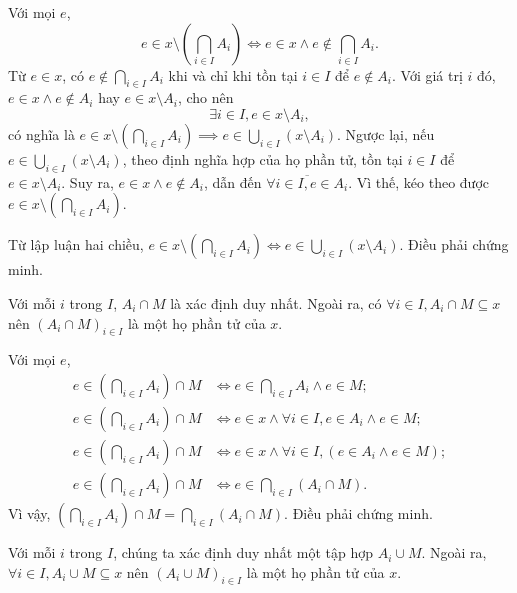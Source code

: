 \stepSubexercise Với mọi $e$, \begin{equation*}
   e \in x \setminus \left(\bigcap_{i \in I}A_i\right) \iff e \in x \land e \notin \bigcap_{i \in I}A_i.
\end{equation*}
Từ $e \in x$, có $e \notin \bigcap_{i \in I}A_i$ khi và chỉ khi tồn tại $i \in I$ để $e \notin A_i$. Với giá trị $i$ đó, $e \in x \land e \notin A_i$ hay $e \in x \setminus A_i$, cho nên \begin{equation*}
   \exists i \in I, e \in x \setminus A_i,
\end{equation*}
có nghĩa là $e \in x \setminus \left(\bigcap_{i \in I}A_i\right) \implies e \in \bigcup_{i \in I} \left(x \setminus A_i\right)$. Ngược lại, nếu $e \in \bigcup_{i \in I} \left(x \setminus A_i\right)$, theo định nghĩa hợp của họ phần tử, tồn tại $i \in I$ để $e \in x \setminus A_i$. Suy ra, $e \in x \land e \notin A_i$, dẫn đến $\overline{\forall i \in I, e \in A_i}$. Vì thế, kéo theo được $e \in x \setminus \left(\bigcap_{i \in I}A_i\right)$. 

Từ lập luận hai chiều, $e \in x \setminus \left(\bigcap_{i \in I}A_i\right) \iff e \in \bigcup_{i \in I} \left(x \setminus A_i\right)$. Điều phải chứng minh.

\stepSubexercise Với mỗi $i$ trong $I$, $A_i \cap M$ là xác định duy nhất. Ngoài ra, có $\forall i \in I, A_i \cap M \subseteq x$ nên $\left(A_i \cap M\right)_{i \in I}$ là một họ phần tử của $x$.

Với mọi $e$, \begin{align*}
   e \in \left(\bigcap_{i \in I} A_i\right) \cap M &\iff e \in \bigcap_{i \in I} A_i \land e \in M; \\
   e \in \left(\bigcap_{i \in I} A_i\right) \cap M &\iff e \in x \land \forall i \in I, e \in A_i \land e \in M; \\
   e \in \left(\bigcap_{i \in I} A_i\right) \cap M &\iff e \in x \land \forall i \in I, \left(e \in A_i \land e \in M\right); \\
   e \in \left(\bigcap_{i \in I} A_i\right) \cap M &\iff e \in \bigcap_{i \in I} \left(A_i \cap M\right).
\end{align*}
Vì vậy, $\left(\bigcap_{i \in I} A_i\right) \cap M = \bigcap_{i \in I} \left(A_i \cap M\right)$. Điều phải chứng minh.

\stepSubexercise Với mỗi $i$ trong $I$, chúng ta xác định duy nhất một tập hợp $A_i \cup M$. Ngoài ra, $\forall i \in I, A_i \cup M \subseteq x$ nên $\left(A_i \cup M\right)_{i \in I}$ là một họ phần tử của $x$.

